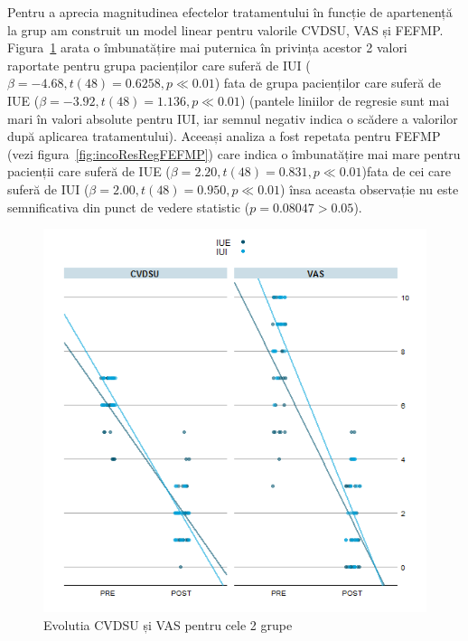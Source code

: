 \documentclass[12pt,draft]{article}
\begin{document}
Pentru a aprecia magnitudinea efectelor tratamentului în funcție de apartenență la grup am construit un model linear pentru valorile \ac{CVDSU}, \ac{VAS} și \ac{FEFMP}. Figura~\ref{fig:incoResRegGrp} arata o îmbunatățire mai puternica în privința acestor 2 valori raportate pentru grupa pacienților care suferă de \ac{IUI} ($\beta=-4.68, t(48)=0.6258, p\ll0.01$) fata de grupa pacienților care suferă de \ac{IUE} ($\beta=-3.92, t(48)=1.136, p\ll0.01$) (pantele liniilor de regresie sunt mai mari în valori absolute pentru \ac{IUI}, iar semnul negativ indica o scădere a valorilor după aplicarea tratamentului). Aceeași analiza a fost repetata pentru \ac{FEFMP} (vezi figura~\ref{fig:incoResRegFEFMP}) care indica o îmbunatățire mai mare pentru pacienții care suferă de \ac{IUE} ($\beta=2.20, t(48)=0.831, p\ll0.01$)fata de cei care suferă de \ac{IUI} ($\beta=2.00, t(48)=0.950, p\ll0.01$) însa aceasta observație nu este semnificativa din punct de vedere statistic ($p=0.08047>0.05$).
  \begin{figure}[H]
    \centering
    \includegraphics[width=0.8\linewidth]{incoResRegGrp}
    \caption{Evolutia \acf{CVDSU} și \acf{VAS} pentru cele 2 grupe}
    \label{fig:incoResRegGrp}
  \end{figure}
\end{document}
